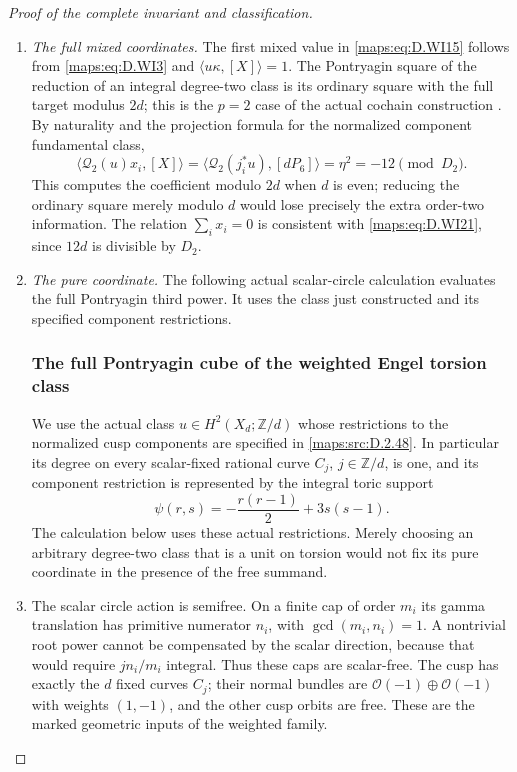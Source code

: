 \begin{proof}[Proof of the complete invariant and classification]
\begin{enumerate}[label=\arabic*.,leftmargin=*]
\item \emph{The full mixed coordinates.}
The first mixed value in \eqref{maps:eq:D.WI15} follows from \eqref{maps:eq:D.WI3} and
$\langle u\kappa,[X]\rangle=1$. The Pontryagin square of the
reduction of an integral degree-two class is its ordinary
square with the full target modulus $2d$; this is the
$p=2$ case of the actual cochain construction
\cite[equations (2.1), (2.8), and (3.4), pp.267--268]{ffThomas56}.
By naturality and the projection formula for the normalized
component fundamental class,
\[
 \langle \mathcal Q_2(u)x_i,[X]\rangle
       =\langle\mathcal Q_2(j_i^*u),[dP_6]\rangle
       =\eta^2=-12\pmod {D_2}.
 \tag{D.WI21}\label{maps:eq:D.WI21}
\]
This computes the coefficient modulo $2d$ when $d$ is even;
reducing the ordinary square merely modulo $d$ would lose
precisely the extra order-two information. The relation
$\sum_i x_i=0$ is consistent with \eqref{maps:eq:D.WI21}, since
$12d$ is divisible by $D_2$.

\item \emph{The pure coordinate.}
The following actual scalar-circle calculation evaluates
the full Pontryagin third power. It uses the class just
constructed and its specified component restrictions.
\subsubsection*{The full Pontryagin cube of the weighted Engel torsion class}
We use the actual class $u\in H^2(X_d;\mathbb Z/d)$ whose
restrictions to the normalized cusp components are specified
in \ref{maps:src:D.2.48}. In particular its degree on every scalar-fixed
rational curve $C_j$, $j\in\mathbb Z/d$, is one, and its
component restriction is represented by the integral toric
support
\[
                  \psi(r,s)=-\frac{r(r-1)}2+3s(s-1).
                                                               \tag{D.TP1}\label{maps:eq:D.TP1}
\]
The calculation below uses these actual restrictions. Merely
choosing an arbitrary degree-two class that is a unit on
torsion would not fix its pure coordinate in the presence
of the free summand.

\item The scalar circle action is semifree. On a finite cap of
order $m_i$ its gamma translation has primitive numerator
$n_i$, with $\gcd(m_i,n_i)=1$. A nontrivial root power cannot
be compensated by the scalar direction, because that would
require $j n_i/m_i$ integral. Thus these caps are scalar-free.
The cusp has exactly the $d$ fixed curves $C_j$; their normal
bundles are $\mathcal O(-1)\oplus\mathcal O(-1)$ with weights
$(1,-1)$, and the other cusp orbits are free. These are the
marked geometric inputs of the weighted family.


\end{enumerate}
\end{proof}

